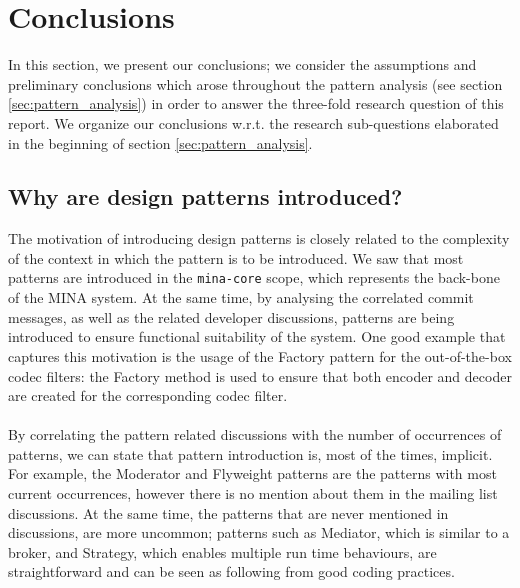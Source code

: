 \section{Conclusions}
\label{sec:conclusion}

In this section, we present our conclusions; we consider the assumptions and preliminary conclusions which arose throughout the pattern analysis (see section \ref{sec:pattern_analysis}) in order to answer the three-fold research question of this report. We organize our conclusions w.r.t. the research sub-questions elaborated in the beginning of section \ref{sec:pattern_analysis}.

\subsection{Why are design patterns introduced?}
The motivation of introducing design patterns is closely related to the complexity of the context in which the pattern is to be introduced. We saw that most patterns are introduced in the \texttt{mina-core} scope, which represents the back-bone of the MINA system. At the same time, by analysing the correlated commit messages, as well as the related developer discussions, patterns are being introduced to ensure functional suitability of the system. One good example that captures this motivation is the usage of the Factory pattern for the out-of-the-box codec filters: the Factory method is used to ensure that both encoder and decoder are created for the corresponding codec filter. \\\\
By correlating the pattern related discussions with the number of occurrences of patterns, we can state that pattern introduction is, most of the times, implicit. For example, the Moderator and Flyweight patterns are the patterns with most current occurrences, however there is no mention about them in the mailing list discussions. At the same time, the patterns that are never mentioned in discussions, are more uncommon; patterns such as Mediator, which is similar to a broker, and Strategy, which enables multiple run time behaviours, are straightforward and can be seen as following from good coding practices.
